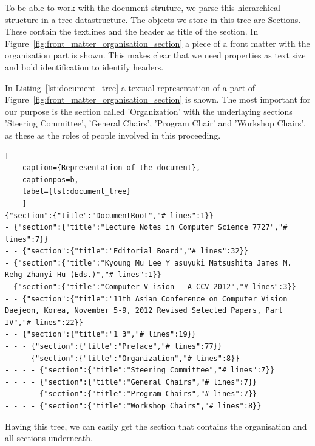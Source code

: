 \documentclass{ou-report}
\begin{document}
To be able to work with the document struture, we parse this hierarchical
structure in a tree datastructure.
The objects we store in this tree are Sections. These contain the 
textlines and the header as title of the section. 
In Figure~\ref{fig:front_matter_organisation_section} a piece of a front matter
with the organisation part is shown. This makes clear that we need properties as
text size and bold identification to identify headers. 



In
Listing~\ref{lst:document_tree} a textual representation of a part of
Figure~\ref{fig:front_matter_organisation_section} is shown.
The most important for our purpose is the section called 'Organization' with
the underlaying sections 'Steering Committee', 'General Chairs', 'Program Chair'
and 'Workshop Chairs', as these as the roles of people involved in this
proceeding.

\begin{lstlisting}[
    caption={Representation of the document},
    captionpos=b,
    label={lst:document_tree}
    ]
{"section":{"title":"DocumentRoot","# lines":1}}
- {"section":{"title":"Lecture Notes in Computer Science 7727","# lines":7}}
- - {"section":{"title":"Editorial Board","# lines":32}}
- {"section":{"title":"Kyoung Mu Lee Y asuyuki Matsushita James M. Rehg Zhanyi Hu (Eds.)","# lines":1}}
- {"section":{"title":"Computer V ision - A CCV 2012","# lines":3}}
- - {"section":{"title":"11th Asian Conference on Computer Vision Daejeon, Korea, November 5-9, 2012 Revised Selected Papers, Part IV","# lines":22}}
- - {"section":{"title":"1 3","# lines":19}}
- - - {"section":{"title":"Preface","# lines":77}}
- - - {"section":{"title":"Organization","# lines":8}}
- - - - {"section":{"title":"Steering Committee","# lines":7}}
- - - - {"section":{"title":"General Chairs","# lines":7}}
- - - - {"section":{"title":"Program Chairs","# lines":7}}
- - - - {"section":{"title":"Workshop Chairs","# lines":8}}
\end{lstlisting}

Having this tree, we can easily get the section that contains the organisation
and all sections underneath.
\end{document}
